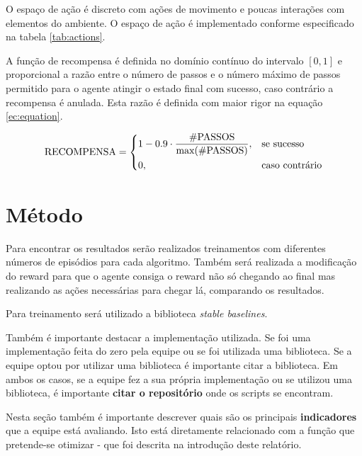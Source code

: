 \documentclass[9pt,a4paper,twoside]{tau}
\begin{document}
O espaço de ação é discreto com ações de movimento e poucas interações com elementos do ambiente. O espaço de ação é implementado conforme especificado na tabela \ref{tab:actions}.

A função de recompensa é definida no domínio contínuo do intervalo \([0, 1]\) e proporcional a razão entre o número de passos e o número máximo de passos permitido para o agente atingir o estado final com sucesso, caso contrário a recompensa é anulada. Esta razão é definida com maior rigor na equação \ref{ec:equation}.

\begin{equation}
    \label{ec:equation}
    \text{RECOMPENSA} =
    \begin{dcases}
        1-0.9\cdot\frac{\text{\#PASSOS}}{\text{max(\#PASSOS)}}, & \text{se sucesso}     \\
        0,                                                      & \text{caso contrário}
    \end{dcases}
\end{equation}


\section{Método}

Para encontrar os resultados serão realizados treinamentos com diferentes números de episódios para cada algoritmo. Também será realizada a modificação do reward para que o agente consiga o reward não só chegando ao final mas realizando as ações necessárias para chegar lá, comparando os resultados.

\begin{info}[frametitle=Atenção]
    Para treinamento será utilizado a biblioteca \textit{stable baselines}.
\end{info}

Também é importante destacar a implementação utilizada. Se foi uma implementação feita do zero pela equipe ou se foi utilizada uma biblioteca. Se a equipe optou por utilizar uma biblioteca é importante citar a biblioteca. Em ambos os casos, se a equipe fez a sua própria implementação ou se utilizou uma biblioteca, é importante \textbf{citar o repositório} onde os scripts se encontram.

Nesta seção também é importante descrever quais são os principais \textbf{indicadores} que a equipe está avaliando. Isto está diretamente relacionado com a função que pretende-se otimizar - que foi descrita na introdução deste relatório.
\end{document}
